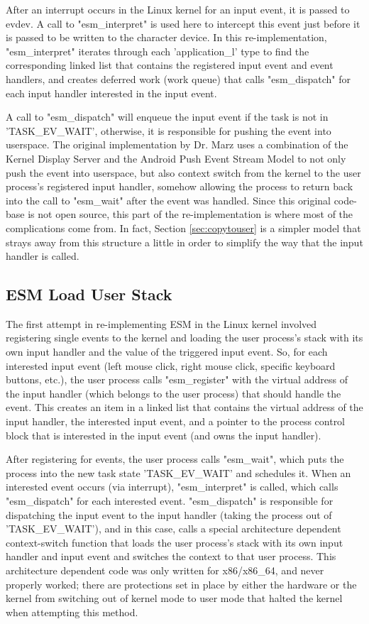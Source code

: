 \documentclass[10pt,journal,compsoc]{IEEEtran}
\begin{document}
After an interrupt occurs in the Linux kernel for an input event, it is passed to evdev. A call to "esm\_interpret" is used here to intercept this event just before it is passed to be written to the character device. In this re-implementation, "esm\_interpret" iterates through each 'application\_l' type to find the corresponding linked list that contains the registered input event and event handlers, and creates deferred work (work queue) that calls "esm\_dispatch" for each input handler interested in the input event.

A call to "esm\_dispatch" will enqueue the input event if the task is not in 'TASK\_EV\_WAIT', otherwise, it is responsible for pushing the event into userspace. The original implementation by Dr. Marz uses a combination of the Kernel Display Server and the Android Push Event Stream Model to not only push the event into userspace, but also context switch from the kernel to the user process's registered input handler, somehow allowing the process to return back into the call to "esm\_wait" after the event was handled. Since this original code-base is not open source, this part of the re-implementation is where most of the complications come from. In fact, Section \ref{sec:copytouser} is a simpler model that strays away from this structure a little in order to simplify the way that the input handler is called.

\subsection{ESM Load User Stack}
\label{sec:userstack}
The first attempt in re-implementing ESM in the Linux kernel involved registering single events to the kernel and loading the user process's stack with its own input handler and the value of the triggered input event. So, for each interested input event (left mouse click, right mouse click, specific keyboard buttons, etc.), the user process calls "esm\_register" with the virtual address of the input handler (which belongs to the user process) that should handle the event. This creates an item in a linked list that contains the virtual address of the input handler, the interested input event, and a pointer to the process control block that is interested in the input event (and owns the input handler).

After registering for events, the user process calls "esm\_wait", which puts the process into the new task state 'TASK\_EV\_WAIT' and schedules it. When an interested event occurs (via interrupt), "esm\_interpret" is called, which calls "esm\_dispatch" for each interested event. "esm\_dispatch" is responsible for dispatching the input event to the input handler (taking the process out of 'TASK\_EV\_WAIT'), and in this case, calls a special architecture dependent context-switch function that loads the user process's stack with its own input handler and input event and switches the context to that user process. This architecture dependent code was only written for x86/x86\_64, and never properly worked; there are protections set in place by either the hardware or the kernel from switching out of kernel mode to user mode that halted the kernel when attempting this method.
\end{document}
